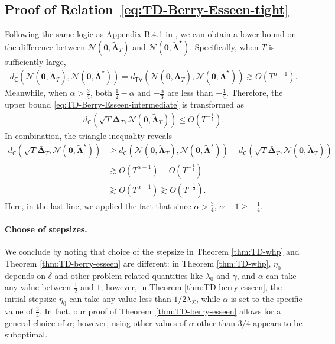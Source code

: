 \subsection{Proof of Relation~\eqref{eq:TD-Berry-Esseen-tight}}\label{app:proof-Berry-Esseen-tight} 
Following the same logic as Appendix B.4.1 in \cite{wu2024statistical}, we can obtain a lower bound on the difference between $\mathcal{N}(\bm{0},\tilde{\bm{\Lambda}}_T)$ and $\mathcal{N}(\bm{0},\tilde{\bm{\Lambda}}^\star)$. Specifically, when $T$ is sufficiently large,
\begin{align*}
d_{\mathsf{C}}(\mathcal{N}(\bm{0},\tilde{\bm{\Lambda}}_T),\mathcal{N}(\bm{0},\tilde{\bm{\Lambda}}^\star)) = d_{\mathsf{TV}}(\mathcal{N}(\bm{0},\tilde{\bm{\Lambda}}_T),\mathcal{N}(\bm{0},\tilde{\bm{\Lambda}}^\star)) \gtrsim O(T^{\alpha-1}).
\end{align*}
Meanwhile, when $\alpha > \frac{3}{4}$, both $\frac{1}{2}-\alpha$ and $-\frac{\alpha}{3}$ are less than $-\frac{1}{4}$. Therefore, the upper bound \eqref{eq:TD-Berry-Esseen-intermediate} is transformed as
\begin{align*}
d_\mathsf{C}(\sqrt{T}\bar{\bm{\Delta}}_T,\mathcal{N}(\bm{0},\tilde{\bm{\Lambda}}_T )) \leq O(T^{-\frac{1}{4}}).
\end{align*}
In combination, the triangle inequality reveals
\begin{align*}
d_{\mathsf{C}}(\sqrt{T}\bar{\bm{\Delta}}_T,\mathcal{N}(\bm{0},\tilde{\bm{\Lambda}}^\star)) &\geq d_{\mathsf{C}}(\mathcal{N}(\bm{0},\tilde{\bm{\Lambda}}_T),\mathcal{N}(\bm{0},\tilde{\bm{\Lambda}}^\star)) - d_\mathsf{C}(\sqrt{T}\bar{\bm{\Delta}}_T,\mathcal{N}(\bm{0},\tilde{\bm{\Lambda}}_T ))\\ 
&\gtrsim O(T^{\alpha-1}) - O(T^{-\frac{1}{4}})\\ 
&\gtrsim O(T^{\alpha-1}) \gtrsim O(T^{-\frac{1}{4}}).
\end{align*}
Here, in the last line, we applied the fact that since $\alpha > \frac{3}{4}$, $\alpha - 1 \geq -\frac{1}{4}$.

\paragraph{Choose of stepsizes.} We conclude by noting that choice of the stepsize in Theorem \ref{thm:TD-whp} and Theorem \ref{thm:TD-berry-esseen} are different: in Theorem \ref{thm:TD-whp}, $\eta_0$ depends on $\delta$ and other problem-related quantities like $\lambda_0$ and $\gamma$, and $\alpha$ can take any value between $\frac{1}{2}$ and $1$; however, in Theorem \ref{thm:TD-berry-esseen}, the initial stepsize $\eta_0$ can take any value less than $1/2\lambda_{\Sigma}$, while $\alpha$ is set to the specific value of $\frac{3}{4}$. In fact, our proof of Theorem~\ref{thm:TD-berry-esseen} allows for a general choice of $\alpha$; however, using other values of $\alpha$ other than $3/4$ appears to be suboptimal.
